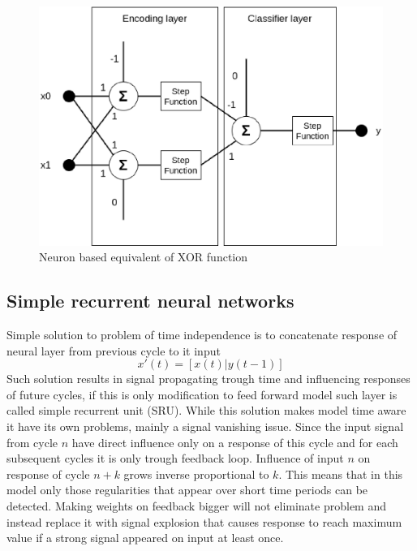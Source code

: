 \begin{figure}[htb] 
	\label{fig:neuro_xor}
	\centering
	\includegraphics[width=\textwidth]{figures/neuro_xor}
	\caption{Neuron based equivalent of XOR function}
\end{figure}

\subsection{Simple recurrent neural networks}
Simple solution to problem of time independence is to concatenate response of neural layer
from previous cycle to it input 
\begin{equation}
	\label{equ:sru_input}
	x'(t)=[x(t)|y(t-1)]
\end{equation}
Such solution results in signal propagating trough time and influencing responses of future cycles,
if this is only modification to feed forward model such layer is called simple recurrent
unit (SRU).
While this solution makes model time aware it have its own problems, mainly a signal vanishing
issue. Since the input signal from cycle $n$ have direct influence only on a response of this
cycle and for each subsequent cycles it is only trough feedback loop. Influence of input $n$ on
response of cycle $n+k$ grows inverse proportional to $k$.
This means that in this model only those regularities that appear over short time periods can
be detected.
Making weights on feedback bigger will not eliminate problem and instead replace it with signal
explosion that causes response to reach maximum value if a strong signal appeared on input at
least once.

